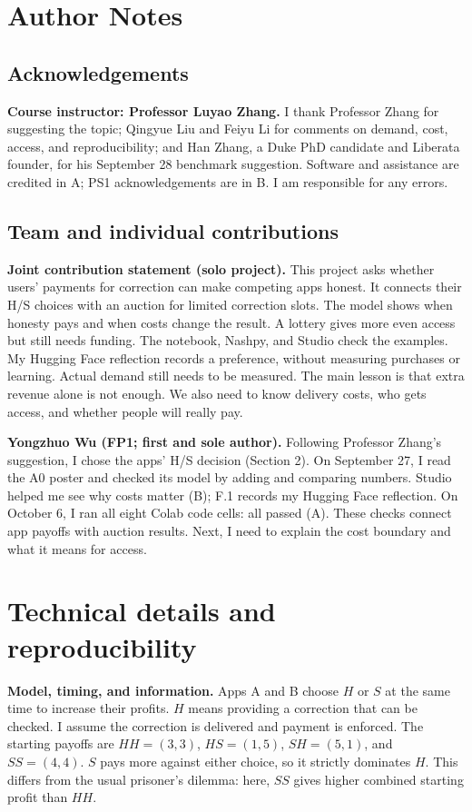 \clearpage\nobalance
\section*{Author Notes}
\subsection*{Acknowledgements}
\noindent\textbf{Course instructor: Professor Luyao Zhang.}
I thank Professor Zhang for suggesting the topic; Qingyue Liu and Feiyu Li for comments on demand, cost, access, and reproducibility; and Han Zhang, a Duke PhD candidate and Liberata founder, for his September 28 benchmark suggestion. Software and assistance are credited in A; PS1 acknowledgements are in B. I am responsible for any errors.

\subsection*{Team and individual contributions}
\textbf{Joint contribution statement (solo project).}
This project asks whether users' payments for correction can make competing apps honest. It connects their H/S choices with an auction for limited correction slots. The model shows when honesty pays and when costs change the result. A lottery gives more even access but still needs funding. The notebook, Nashpy, and Studio check the examples. My Hugging Face reflection records a preference, without measuring purchases or learning. Actual demand still needs to be measured. The main lesson is that extra revenue alone is not enough. We also need to know delivery costs, who gets access, and whether people will really pay.

\noindent\textbf{Yongzhuo Wu (FP1; first and sole author).}
Following Professor Zhang's suggestion, I chose the apps' H/S decision (Section 2). On September 27, I read the A0 poster and checked its model by adding and comparing numbers. Studio helped me see why costs matter (B); F.1 records my Hugging Face reflection. On October 6, I ran all eight Colab code cells: all passed (A). These checks connect app payoffs with auction results. Next, I need to explain the cost boundary and what it means for access.


\appendix
\section{Technical details and reproducibility}
\noindent\textbf{Model, timing, and information.}
Apps A and B choose $H$ or $S$ at the same time to increase their profits. $H$ means providing a correction that can be checked. I assume the correction is delivered and payment is enforced. The starting payoffs are $HH=(3,3)$, $HS=(1,5)$, $SH=(5,1)$, and $SS=(4,4)$. $S$ pays more against either choice, so it strictly dominates $H$. This differs from the usual prisoner's dilemma: here, $SS$ gives higher combined starting profit than $HH$.

